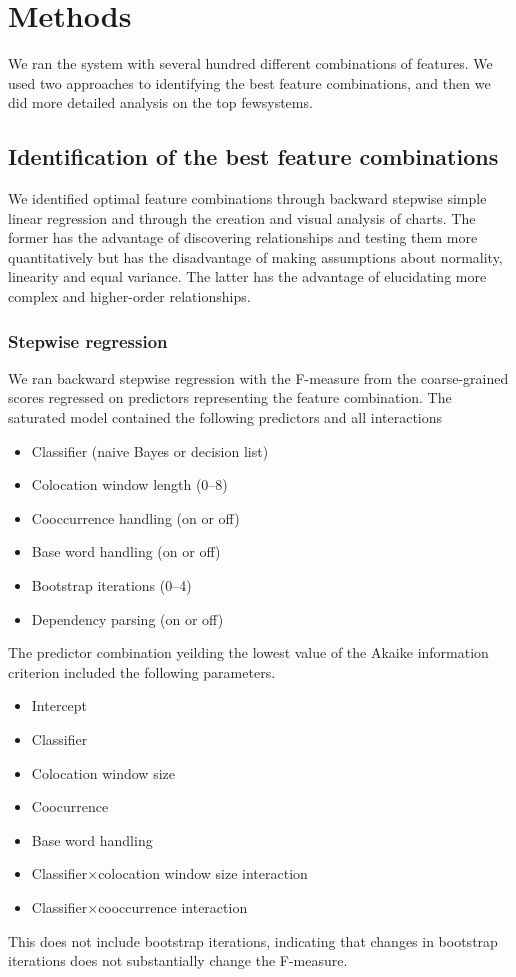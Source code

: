 \section{Methods}
\newcommand\few{few}
We ran the system with several hundred different combinations of features.
We used two approaches to identifying the best feature combinations, and then
we did more detailed analysis on the top \few systems.

\subsection{Identification of the best feature combinations}
We identified optimal feature combinations through backward stepwise simple linear regression
and through the creation and visual analysis of charts. The former has the
advantage of discovering relationships and testing them more quantitatively
but has the disadvantage of making assumptions about normality, linearity and equal variance.
The latter has the advantage of elucidating more complex and higher-order relationships.

\subsubsection{Stepwise regression}
We ran backward stepwise regression with the F-measure from the coarse-grained scores
regressed on predictors representing the feature combination.
The saturated model contained the following predictors and all interactions
\begin{itemize}
\item Classifier (naive Bayes or decision list)
\item Colocation window length (0--8)
\item Cooccurrence handling (on or off)
\item Base word handling (on or off)
\item Bootstrap iterations (0--4)
\item Dependency parsing (on or off)
\end{itemize}
The predictor combination yeilding the lowest value of the Akaike information criterion
included the following parameters.
\begin{itemize}
\item Intercept
\item Classifier
\item Colocation window size
\item Coocurrence
\item Base word handling
\item Classifier$\times$colocation window size interaction
\item Classifier$\times$cooccurrence interaction
\end{itemize}
This does not include bootstrap iterations, indicating that changes
in bootstrap iterations does not substantially change the F-measure.

